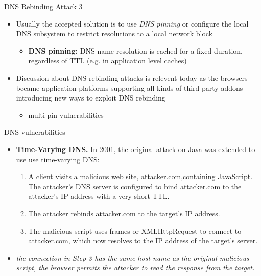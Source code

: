 \documentclass{beamer}
\begin{document}
\begin{frame}{DNS Rebinding Attack 3}
    \begin{itemize}
        \item Usually the accepted solution is to use \textit{DNS pinning} or
        configure the local DNS subsystem to restrict resolutions to a local
        network block
        \begin{itemize}
            \item \textbf{DNS pinning:} DNS name resolution is cached for a fixed duration, regardless
            of TTL (e.g. in application level caches)
        \end{itemize}
        \item Discussion about DNS rebinding attacks is relevent today as the
        browsers became application platforms supporting all kinds of
        third-party addons introducing new ways to exploit DNS rebinding
        \begin{itemize}
            \item multi-pin vulnerabilities
        \end{itemize}
    \end{itemize}
\end{frame}

\begin{frame}{DNS vulnerabilities}
    \begin{itemize}
        \item \textbf{Time-Varying DNS.}  In 2001, the original attack on Java was extended to use use time-varying DNS:
         \begin{enumerate}
            \item A client visits a malicious web site, attacker.com,containing JavaScript. The attacker’s DNS server is configured to bind attacker.com to the attacker’s IP address with a very short TTL.
 			\item The attacker rebinds attacker.com to the target’s IP address.
			\item The malicious script uses frames or XMLHttpRequest to connect to attacker.com, which now resolves to the IP address of the target’s server.
         \end{enumerate}
         \item \textit{the connection in Step 3 has the same host name as the
         original malicious script, the browser permits the attacker to read the response from the target.
}
    \end{itemize}
\end{frame}
\end{document}
